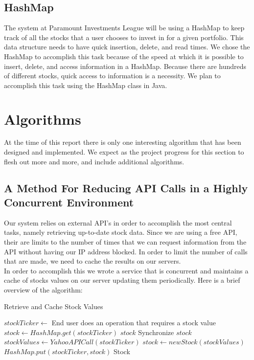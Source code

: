 \subsection{HashMap}
The system at Paramount Investments League will be using a HashMap to keep track
of all the stocks that a user chooses to invest in for a given portfolio.  This
data structure needs to have quick insertion, delete, and read times.  We chose
the HashMap to accomplish this task because of the speed at which it is
possible to insert, delete, and access information in a HashMap.  Because there
are hundreds of different stocks, quick access to information is a necessity.
We plan to accomplish this task using the HashMap class in Java.

\section{Algorithms}

At the time of this report there is only one interesting algorithm that has been
designed and implemented.  We expect as the project progress for this section
to flesh out more and more, and include additional algorithms.

\subsection{A Method For Reducing API Calls in a Highly Concurrent Environment}

Our system relies on external API's\cite{wiki:api} in order to accomplish the
most central tasks, namely retrieving up-to-date stock data.  Since we are using
a free API, their are limits to the number of times that we can request
information from the API without having our IP address\cite{wiki:ip} blocked.
In order to limit the number of calls that are made, we need to cache the
results on our servers.\\

In order to accomplish this we wrote a service that is concurrent and maintains
a cache of stocks values on our server updating them periodically.  Here is a
brief overview of the algorithm:\\

\begin{algorithm}[H]
  \caption { Retrieve and Cache Stock Values }
$stockTicker \leftarrow$ End user does an operation that requires a stock value\;
$stock \leftarrow HashMap.get(stockTicker)$\;
{
  \Return $stock$\;
}
Synchronize\;
{
  \Return $stock$\;
}
$stockValues \leftarrow YahooAPICall(stockTicker)$\;
$stock \leftarrow new Stock(stockValues)$\;
$HashMap.put(stockTicker, stock)$\;
\Return Stock\;
\end{algorithm}

